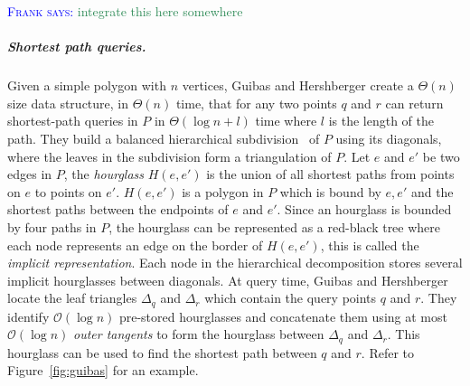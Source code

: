\documentclass[UKenglish]{lipics-v2019}
\newcommand{\myremark}[4]{\textcolor{blue}{\textsc{#1 #2:}} \textcolor{#4}{\textsf{#3}}}
\newcommand{\frank}[2][says]{\myremark{Frank}{#1}{#2}{SeaGreen}}
\begin{document}
\frank{integrate this here somewhere}
\subparagraph{Shortest path queries.}
Given a simple polygon with $n$ vertices, Guibas and Hershberger \cite{guibas1989optimal} create a $\Theta(n)$ size data structure, in $\Theta(n)$ time, that for any two points $q$ and $r$ can return shortest-path queries in $P$ in $\Theta(\log n + l)$ time where $l$ is the length of the path. They build a balanced hierarchical subdivision~\cite{FRANK} of $P$ using its diagonals, where the leaves in the subdivision form a triangulation of $P$.
Let $e$ and $e'$ be two edges in $P$, the \emph{hourglass} $H(e, e')$ is the union of all shortest paths from points on $e$ to points on $e'$. $H(e, e')$ is a polygon in $P$ which is bound by $e, e'$ and the shortest paths between the endpoints of $e$ and $e'$. Since an hourglass is bounded by four paths in $P$, the hourglass can be represented as a red-black tree where each node represents an edge on the border of $H(e, e')$, this is called the \emph{implicit representation}. Each node in the hierarchical decomposition stores several implicit hourglasses between diagonals. At query time, Guibas and Hershberger locate the leaf triangles $\Delta_q$ and $\Delta_r$ which contain the query points $q$ and $r$. They identify  $\mathcal{O}(\log n)$ pre-stored hourglasses and concatenate them using at most $\mathcal{O}(\log n)$ \emph{outer tangents} to form the hourglass between $\Delta_q$ and $\Delta_r$. This hourglass can be used to find the shortest path between $q$ and $r$. Refer to Figure~\ref{fig:guibas} for an example. 
%
\end{document}
